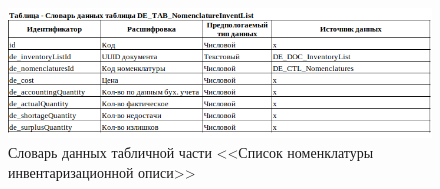\begin{figure}[!h]
    \centering
    \includegraphics[width=14cm]
    {assets/InformationalModel/DE_TAB_NomenclatureInventList.png}
    \caption{Словарь данных табличной части <<Список номенклатуры инвентаризационной описи>>}
    \label{fig:InformationalModel_DE_TAB_NomenclatureInventList}
\end{figure}












